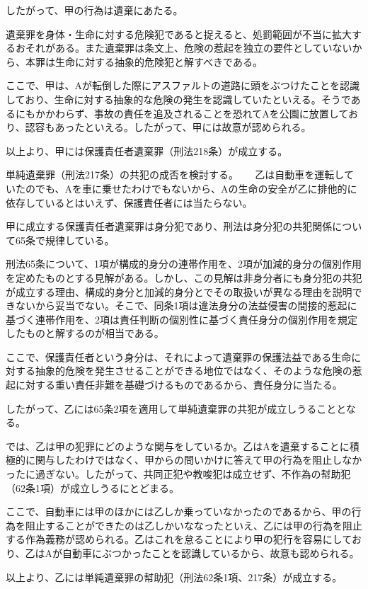 \documentclass[
  jafontsize=11bp,
  jafontscale=0.92,
   jfm_yoko=jlreq,
  jlreq_notes,
]{jlreq}
\begin{document}
	   したがって、甲の行為は遺棄にあたる。
	  
	  \sectionC{}
	  	遺棄罪を身体・生命に対する危険犯であると捉えると、処罰範囲が不当に拡大するおそれがある。また遺棄罪は条文上、危険の惹起を独立の要件としていないから、本罪は生命に対する抽象的危険犯と解すべきである。
	  	
	  	ここで、甲は、Aが転倒した際にアスファルトの道路に頭をぶつけたことを認識しており、生命に対する抽象的な危険の発生を認識していたといえる。そうであるにもかかわらず、事故の責任を追及されることを恐れてAを公園に放置しており、認容もあったといえる。したがって、甲には故意が認められる。
	  	
	  	以上より、甲には保護責任者遺棄罪（刑法218条）が成立する。
	
	単純遺棄罪（刑法217条）の共犯の成否を検討する。
　\sectionB{}
		乙は自動車を運転していたのでも、Aを車に乗せたわけでもないから、Aの生命の安全が乙に排他的に依存しているとはいえず、保護責任者には当たらない。

	甲に成立する保護責任者遺棄罪は身分犯であり、刑法は身分犯の共犯関係について65条で規律している。
	
	刑法65条について、1項が構成的身分の連帯作用を、2項が加減的身分の個別作用を定めたものとする見解がある。しかし、この見解は非身分者にも身分犯の共犯が成立する理由、構成的身分と加減的身分とでその取扱いが異なる理由を説明できないから妥当でない。そこで、同条1項は違法身分の法益侵害の間接的惹起に基づく連帯作用を、2項は責任判断の個別性に基づく責任身分の個別作用を規定したものと解するのが相当である。
	
	ここで、保護責任者という身分は、それによって遺棄罪の保護法益である生命に対する抽象的危険を発生させることができる地位ではなく、そのような危険の惹起に対する重い責任非難を基礎づけるものであるから、責任身分に当たる。
	
	したがって、乙には65条2項を適用して単純遺棄罪の共犯が成立しうることとなる。

\sectionB{}
	では、乙は甲の犯罪にどのような関与をしているか。乙はAを遺棄することに積極的に関与したわけではなく、甲からの問いかけに答えて甲の行為を阻止しなかったに過ぎない。したがって、共同正犯や教唆犯は成立せず、不作為の幇助犯（62条1項）が成立しうるにとどまる。
	
	ここで、自動車には甲のほかには乙しか乗っていなかったのであるから、甲の行為を阻止することができたのは乙しかいななったといえ、乙には甲の行為を阻止する作為義務が認められる。乙はこれを怠ることにより甲の犯行を容易にしており、乙はAが自動車にぶつかったことを認識しているから、故意も認められる。
	
	以上より、乙には単純遺棄罪の幇助犯（刑法62条1項、217条）が成立する。
	
\end{document}
